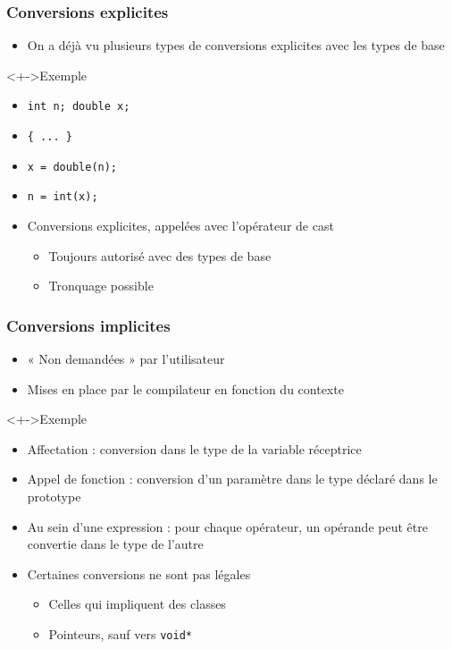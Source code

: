 \begin{frame}
\frametitle{Conversions explicites}
\begin{itemize}[<+->]
\item On a déjà vu plusieurs types de conversions explicites avec les types de base
\end{itemize}
\begin{exampleblock}<+->{Exemple}
	\begin{itemize}
	\item \lstinline|int n; double x;|
	\item \texttt{\{ ... \}}
	\item \lstinline|x = double(n);|
	\item \lstinline|n = int(x);|
	\end{itemize}
\end{exampleblock}
\begin{itemize}[<+->]
\item Conversions explicites, appelées avec l'opérateur de cast
	\begin{itemize}
	\item Toujours autorisé avec des types de base
	\item Tronquage possible
	\end{itemize}
\end{itemize}
\end{frame}

\begin{frame}
\frametitle{Conversions implicites}
\begin{itemize}[<+->]
\item « Non demandées » par l'utilisateur
\item Mises en place par le compilateur en fonction du contexte
\end{itemize}
\begin{exampleblock}<+->{Exemple}
	\begin{itemize}[<+->]
	\item Affectation : conversion dans le type de la variable réceptrice
	\item Appel de fonction : conversion d'un paramètre dans le type déclaré dans le prototype
	\item Au sein d'une expression : pour chaque opérateur, un opérande peut être convertie dans le type de l'autre
	\end{itemize}
\end{exampleblock}
\begin{itemize}[<+->]
\item Certaines conversions ne sont pas légales
	\begin{itemize}
	\item Celles qui impliquent des classes
	\item Pointeurs, sauf vers \lstinline|void*|
	\end{itemize}
\end{itemize}
\end{frame}


